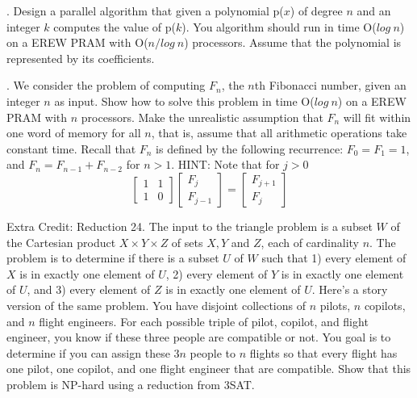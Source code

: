\documentclass[10pt]{article}
\begin{document}
. Design a parallel algorithm that given a polynomial p($x$) of degree $n$ and an integer $k$ computes the value
of p($k$). You algorithm should run in time O($log~n$) on a EREW PRAM with O($n/log~n$) processors.
Assume that the polynomial is represented by its coefficients.

. We consider the problem of computing $F_n$, the $n$th Fibonacci number, given an integer $n$ as input.
Show how to solve this problem in time O($log~n$) on a EREW PRAM with $n$ processors. Make the
unrealistic assumption that $F_n$ will fit within one word of memory for all $n$, that is, assume that
all arithmetic operations take constant time. Recall that $F_n$ is defined by the following recurrence:
$F_{0} = F_{1} = 1$, and $F_{n} = F_{n-1} + F_{n-2}$ for $n > 1$.
HINT: Note that for $j > 0$
\[
\left[ \begin{array}{cc}
1 & 1\\
1 & 0
\end{array} \right]
\left[ \begin{array}{c}
F_j\\
F_{j-1}
\end{array} \right]
=
\left[ \begin{array}{c}
F_{j+1}\\
F_j
\end{array} \right]
\]

\newpage
Extra Credit: Reduction 24. The input to the triangle problem is a subset $W$ of the Cartesian product $X \times Y \times Z$ of sets $X, Y$
and $Z$, each of cardinality $n$. The problem is to determine if there is a subset $U$ of $W$ such that 1)
every element of $X$ is in exactly one element of $U$, 2) every element of $Y$ is in exactly one element
of $U$, and 3) every element of $Z$ is in exactly one element of $U$. Here's a story version of the same
problem. You have disjoint collections of $n$ pilots, $n$ copilots, and $n$ flight engineers. For each possible
triple of pilot, copilot, and flight engineer, you know if these three people are compatible or not. You
goal is to determine if you can assign these $3n$ people to $n$ flights so that every flight has one pilot,
one copilot, and one flight engineer that are compatible. Show that this problem is NP-hard using a
reduction from 3SAT.
\end{document}
